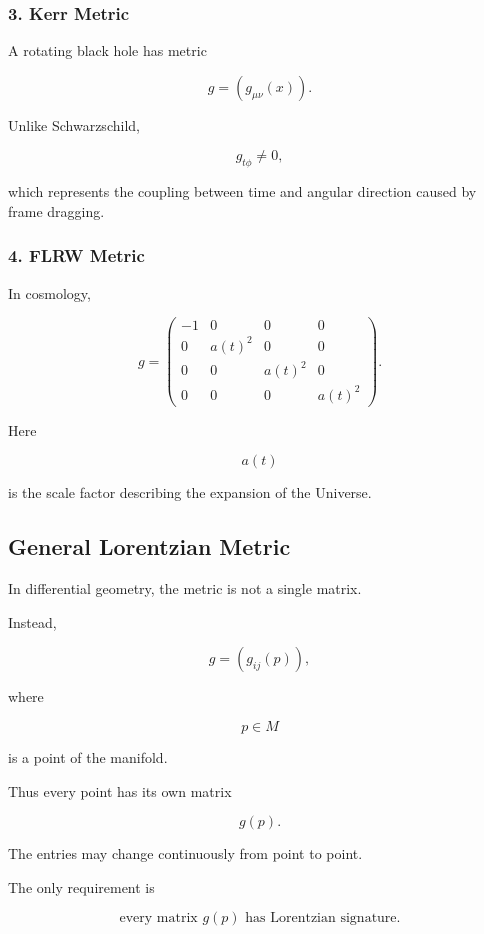 \documentclass[12pt,a4paper]{article}
\theoremstyle{notespace}
\begin{document}
\subsubsection*{3. Kerr Metric}

A rotating black hole has metric

\[
g=(g_{\mu\nu}(x)).
\]

Unlike Schwarzschild,

\[
g_{t\phi}\neq0,
\]

which represents the coupling between time and angular direction caused by frame dragging.


\subsubsection*{4. FLRW Metric}

In cosmology,

\[
g=
\begin{pmatrix}
	-1&0&0&0\\
	0&a(t)^2&0&0\\
	0&0&a(t)^2&0\\
	0&0&0&a(t)^2
\end{pmatrix}.
\]

Here

\[
a(t)
\]

is the scale factor describing the expansion of the Universe.


\subsection{General Lorentzian Metric}

In differential geometry, the metric is not a single matrix.

Instead,

\[
g=(g_{ij}(p)),
\]

where

\[
p\in M
\]

is a point of the manifold.

Thus every point has its own matrix

\[
g(p).
\]

The entries may change continuously from point to point.

The only requirement is

\[
\boxed{\text{every matrix }g(p)\text{ has Lorentzian signature}.}
\]
\end{document}
